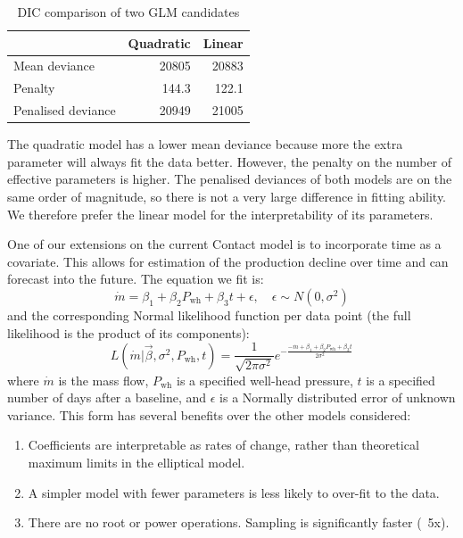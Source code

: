 \documentclass[a4paper, 12pt]{article}
\begin{document}
\begin{table}[ht]
\centering
\begin{tabular}{lrr}
  \hline
& Quadratic & Linear \\ 
  \hline
Mean deviance & 20805 & 20883 \\
Penalty & 144.3 & 122.1 \\
Penalised deviance & 20949 & 21005\\
   \hline
\end{tabular}
\caption{DIC comparison of two GLM candidates} 
\label{tab:curvature}
\end{table}

The quadratic model has a lower mean deviance because more the extra parameter will always fit the data better. However, the penalty on the number of effective parameters is higher. The penalised deviances of both models are on the same order of magnitude, so there is not a very large difference in fitting ability. We therefore prefer the linear model for the interpretability of its parameters.

One of our extensions on the current Contact model is to incorporate time as a covariate. This allows for estimation of the production decline over time and can forecast into the future. The equation we fit is:
\begin{equation} \label{eq:linreg}
\dot{m} = \beta_1 + \beta_2P_\text{wh} + \beta_3t + \epsilon,\quad \epsilon\sim N(0, \sigma^2)
\end{equation}
and the corresponding Normal likelihood function per data point (the full likelihood is the product of its components):
\begin{equation}
L\left( \dot{m} | \vec{\beta},\sigma^2,P_\text{wh},t \right) = \frac{1}{\sqrt{2\pi\sigma^2}} e^{-\frac{-\dot{m} + \beta_1 + \beta_2P_\text{wh} + \beta_3t}{2\sigma^2}}
\end{equation}
where $\dot{m}$ is the mass flow, $P_\text{wh}$ is a specified well-head pressure, $t$ is a specified number of days after a baseline, and $\epsilon$ is a Normally distributed error of unknown variance. This form has several benefits over the other models considered:

\begin{enumerate}
\item Coefficients are interpretable as rates of change, rather than theoretical maximum limits in the elliptical model.
\item A simpler model with fewer parameters is less likely to over-fit to the data.
\item There are no root or power operations. Sampling is significantly faster (~5x).
\end{enumerate}
\end{document}
